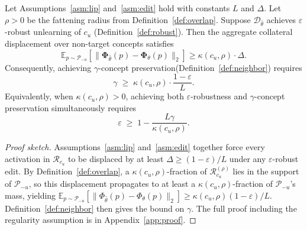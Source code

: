 \begin{theorem}
\label{thm:tradeoff}
Let Assumptions~\ref{asm:lip} and~\ref{asm:edit} hold with constants $L$ and $\Delta$.
Let $\rho > 0$ be the fattening radius from Definition~\ref{def:overlap}.
Suppose $\mathcal{D}_{\hat\theta}$ achieves $\varepsilon$-robust unlearning of $c_u$
(Definition~\ref{def:robust}).
Then the aggregate collateral displacement over non-target concepts satisfies
\begin{equation}
    \mathbb{E}_{p\sim \mathcal{P}_{-u}}
    \left[
\|\boldsymbol{\Phi}_{\hat{\theta}}(p)-\boldsymbol{\Phi}_{\theta}(p)\|_2
    \right]
    \geq
    \kappa(c_u,\rho)\cdot \Delta .
\end{equation}
Consequently, achieving $\gamma$-concept preservation(Definition~\ref{def:neighbor}) requires
\begin{equation}
\label{eq:tradeoff}
    \boxed{
    \gamma \;\geq\; \kappa(c_u,\rho)\cdot\frac{1-\varepsilon}{L}.
    }
\end{equation}
Equivalently, when $\kappa(c_u,\rho) > 0$, achieving both $\varepsilon$-robustness and $\gamma$-concept preservation simultaneously requires
\begin{equation}
\label{eq:tradeoff_eps}
    \varepsilon \;\geq\; 1 - \frac{L\gamma}{\kappa(c_u,\rho)}.
\end{equation}
\end{theorem}

\begin{proof}[Proof sketch]
Assumptions~\ref{asm:lip} and~\ref{asm:edit} together force every activation in $\mathcal{R}_{c_u}$ to be displaced by at least $\Delta \geq (1-\varepsilon)/L$ under any $\varepsilon$-robust edit. By Definition~\ref{def:overlap}, a $\kappa(c_u,\rho)$-fraction of $\mathcal{R}_{c_u}^{(\rho)}$ lies in the support of $\mathcal{P}_{-u}$, so this displacement propagates to at least a $\kappa(c_u,\rho)$-fraction of $\mathcal{P}_{-u}$'s mass, yielding $\mathbb{E}_{p\sim\mathcal{P}_{-u}}[\|\Phi_{\hat\theta}(p)-\Phi_\theta(p)\|_2] \geq \kappa(c_u,\rho)(1-\varepsilon)/L$. Definition~\ref{def:neighbor} then gives the bound on $\gamma$. The full proof including the regularity assumption is in Appendix~\ref{app:proof}.
\end{proof}

